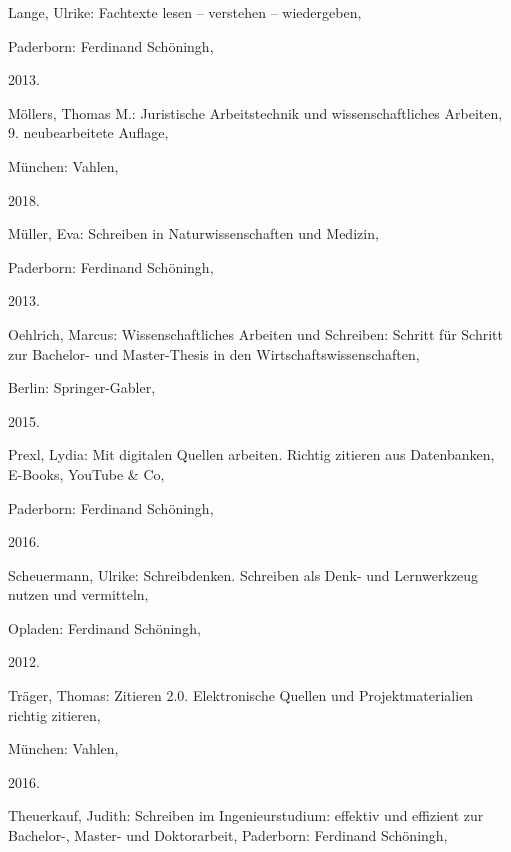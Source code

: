 \documentclass[a4paper,11pt]{article}%
\renewcommand{\\}{\vspace*{0.5\baselineskip} \newline}
\begin{document}
\begin{thebibliography}{1}
	Lange, Ulrike: Fachtexte lesen – verstehen – wiedergeben,

	Paderborn: Ferdinand Schöningh,

	2013.

	


	Möllers, Thomas M.: Juristische Arbeitstechnik und wissenschaftliches Arbeiten, 9. neubearbeitete Auflage,

	München: Vahlen,

	2018.

	


	Müller, Eva: Schreiben in Naturwissenschaften und Medizin,

	Paderborn: Ferdinand Schöningh,

	2013.

	


	Oehlrich, Marcus: Wissenschaftliches Arbeiten und Schreiben: Schritt für Schritt zur Bachelor- und Master-Thesis in den Wirtschaftswissenschaften,

	Berlin: Springer-Gabler,

	2015.

	


	Prexl, Lydia: Mit digitalen Quellen arbeiten. Richtig zitieren aus Datenbanken, E-Books, YouTube \& Co,

	Paderborn: Ferdinand Schöningh,

	2016.

	


	Scheuermann, Ulrike: Schreibdenken. Schreiben als Denk- und Lernwerkzeug nutzen und vermitteln,

	Opladen: Ferdinand Schöningh,

	2012.

	


	Träger, Thomas: Zitieren 2.0. Elektronische Quellen und Projektmaterialien richtig zitieren,

	München: Vahlen,

	2016.

	


	Theuerkauf, Judith: Schreiben im Ingenieurstudium: effektiv und effizient zur Bachelor-, Master- und Doktorarbeit, Paderborn: Ferdinand Schöningh,


\end{thebibliography}
\end{document}
